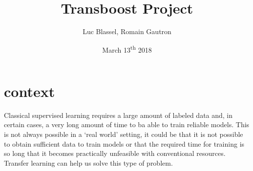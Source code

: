 \documentclass[11 pt]{article}
\title{Transboost Project}
\author{Luc Blassel, Romain Gautron}
\date{March 13\textsuperscript{th} 2018}
\begin{document}
\maketitle

\tableofcontents
\newpage

\section{context}
\paragraph{}Classical supervised learning requires a large amount of labeled data and, in certain cases, a very long amount of time to ba able to train reliable models. This is not always possible in a `real world' setting, it could be that it is not possible to obtain sufficient data to train models or that the required time for training is so long that it becomes practically unfeasible with conventional resources. Transfer learning can help us solve this type of problem. 

\end{document}

